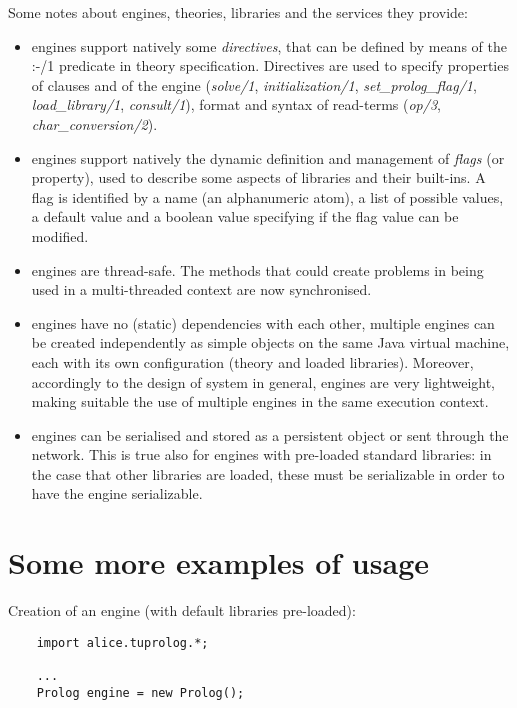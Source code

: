 \noindent Some notes about \tuprolog{} engines, theories,
libraries and the services they provide:

\begin{itemize}
%
\item \tuprolog{} engines support natively some
\emph{directives}, that can be defined by means of the :-/1
predicate in theory specification.
%
Directives are used to specify properties of clauses and of the
engine (\emph{solve/1}, \emph{initialization/1},
\emph{set\_prolog\_flag/1}, \emph{load\_library/1},
\emph{consult/1}), format and syntax of read-terms (\emph{op/3},
\emph{char\_conversion/2}).
%
\item \tuprolog{} engines support natively the dynamic definition
and management of \emph{flags} (or property), used to describe
some aspects of libraries and their built-ins.
%
A flag is identified by a name (an alphanumeric atom), a list of
possible values, a default value and a boolean value specifying if
the flag value can be modified.
%
\item \tuprolog{} engines are thread-safe. The methods that could
create problems in being used in a multi-threaded context are now
synchronised.
%
\item \tuprolog{} engines have no (static) dependencies with each
other, multiple engines can be created independently as simple
objects on the same Java virtual machine,  each with its own
configuration (theory and loaded libraries).
%
Moreover, accordingly to the design of \tuprolog{} system in
general, engines are very lightweight, making suitable the use of
multiple engines in the same execution context.
%
\item \tuprolog{} engines can be serialised and stored as a persistent
object or sent through the network.
%
This is true also for engines with pre-loaded standard libraries:
%
in the case that other libraries are loaded, these must be
serializable in order to have the engine serializable.
%
\end{itemize}

%
%

\section{Some more examples of \tuprolog{} usage}

\noindent Creation of an engine (with default libraries
pre-loaded):

{\tt\scriptsize{
\begin{verbatim}
    import alice.tuprolog.*;

    ...
    Prolog engine = new Prolog();
\end{verbatim} }}


